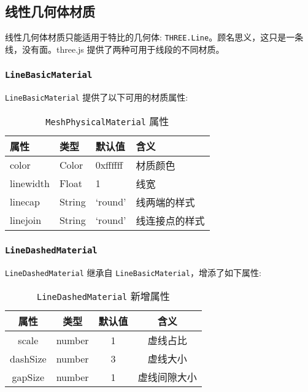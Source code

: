 \subsection{线性几何体材质}

线性几何体材质只能适用于特比的几何体: \texttt{THREE.Line}。顾名思义，这只是一条线，没有面。three.js 提供了两种可用于线段的不同材质。

\subsubsection*{\texttt{LineBasicMaterial}}

\texttt{LineBasicMaterial} 提供了以下可用的材质属性:

\begin{table}[H]
  \centering
  \small
  \caption{\texttt{MeshPhysicalMaterial} 属性}
  \setlength{\tabcolsep}{4mm}
  \begin{tabular}{l|l|l|l}
    \toprule
    \textbf{属性} & \textbf{类型} & \textbf{默认值} & \textbf{含义} \\
    \midrule
    color & Color & 0xffffff & 材质颜色 \\
    linewidth & Float & 1 & 线宽 \\
    linecap & String & `round' & 线两端的样式 \\
    linejoin & String & `round' & 线连接点的样式 \\
    \bottomrule
  \end{tabular}
\end{table}

\subsubsection*{\texttt{LineDashedMaterial}}

\texttt{LineDashedMaterial} 继承自 \texttt{LineBasicMaterial}，增添了如下属性:

\begin{table}[H]
  \centering
  \small
  \caption{\texttt{LineDashedMaterial} 新增属性}
  \setlength{\tabcolsep}{4mm}
  \begin{tabular}{c|ccc}
    \toprule
    \textbf{属性} & \textbf{类型} & \textbf{默认值} & \textbf{含义} \\
    \midrule
    scale & number & 1 & 虚线占比 \\
    dashSize & number & 3 & 虚线大小 \\
    gapSize & number & 1 & 虚线间隙大小 \\
    \bottomrule
  \end{tabular}
\end{table}

\newpage